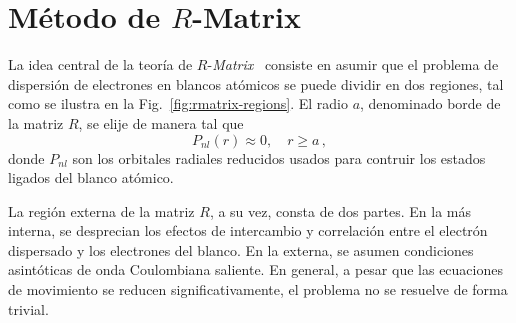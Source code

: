 
\section{Método de $R$-Matrix}
\label{sec:proc-rmatrix}

La idea central de la teoría de $R$-\textit{Matrix}~\cite{Burke:11,
Burke:75,Griffin:07} consiste en asumir que el problema de dispersión de 
electrones en blancos atómicos se puede dividir en dos regiones, tal 
como se ilustra en la Fig.~\ref{fig:rmatrix-regions}. El radio $a$,
denominado borde de la matriz $R$, se elije de manera tal que 
\begin{equation}
P_{nl}(r)\approx 0, \quad r\geq a\,,
\label{eq:RM-Pnl}
\end{equation}
donde $P_{nl}$ son los orbitales radiales reducidos usados para
contruir los estados ligados del blanco atómico.

La región externa de la matriz $R$, a su vez, consta de dos partes. En 
la más interna, se desprecian los efectos de intercambio y correlación 
entre el electrón dispersado y los electrones del blanco. En la externa, 
se asumen condiciones asintóticas de onda Coulombiana saliente. En 
general, a pesar que las ecuaciones de movimiento se reducen 
significativamente, el problema no se resuelve de forma trivial. 

